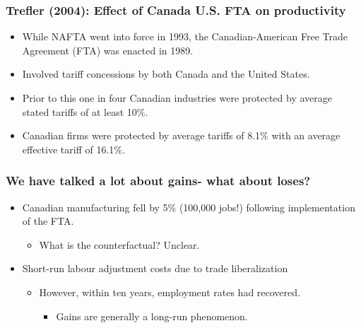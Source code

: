 \documentclass{beamer}
\begin{document}
\begin{frame}
	\frametitle{Trefler (2004): Effect of Canada U.S. FTA on productivity}


\begin{itemize}
	\item While NAFTA went into force in 1993, the Canadian-American Free Trade Agreement (FTA) was enacted in 1989.
	\item Involved tariff concessions by both Canada and the United States.
	\item Prior to this one in four Canadian industries were protected by average stated tariffs of at least 10\%.
	\item Canadian firms were protected by average tariffs of 8.1\% with an average effective tariff of 16.1\%.
\end{itemize}
\end{frame}


\begin{frame}
	\frametitle{We have talked a lot about gains- what about loses?}
\begin{itemize}
	\item Canadian manufacturing fell by 5\% (100,000 jobs!) following implementation of the FTA.
	\begin{itemize}
		\item What is the counterfactual? Unclear.
	\end{itemize}
	\item Short-run labour adjustment costs due to trade liberalization
		\begin{itemize}
			\item However, within ten years, employment rates had recovered.
				\begin{itemize}
					\item Gains are generally a long-run phenomenon. 
				\end{itemize}
		\end{itemize}
\end{itemize}
\end{frame}
\end{document}

